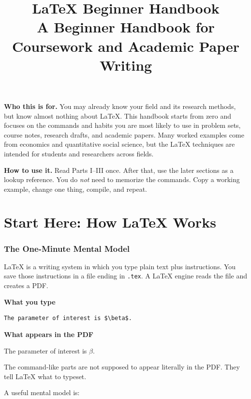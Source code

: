 \documentclass[11pt]{article}
\title{\textbf{LaTeX Beginner Handbook}\\[0.35em]
\large A Beginner Handbook for Coursework and Academic Paper Writing}
\author{}
\date{}
\newcommand{\code}[1]{\texttt{#1}}
\theoremstyle{definition}
\newcommand{\sourcehead}{\par\smallskip\textbf{What you type}\par}
\newcommand{\resulthead}{\par\smallskip\textbf{What appears in the PDF}\par\smallskip}
\begin{document}
\maketitle

\begin{center}
\begin{minipage}{0.91\textwidth}
\small
\textbf{Who this is for.} You may already know your field and its research methods, but know almost nothing about LaTeX. This handbook starts from zero and focuses on the commands and habits you are most likely to use in problem sets, course notes, research drafts, and academic papers. Many worked examples come from economics and quantitative social science, but the LaTeX techniques are intended for students and researchers across fields.

\textbf{How to use it.} Read Parts I--III once. After that, use the later sections as a lookup reference. You do \emph{not} need to memorize the commands. Copy a working example, change one thing, compile, and repeat.
\end{minipage}
\end{center}

\tableofcontents
\clearpage

\part{Start Here: How LaTeX Works}

\section{The One-Minute Mental Model}

LaTeX is a writing system in which you type plain text plus instructions. You save those instructions in a file ending in \code{.tex}. A LaTeX engine reads the file and creates a PDF.

\sourcehead
\begin{lstlisting}
The parameter of interest is $\beta$.
\end{lstlisting}

\resulthead
The parameter of interest is $\beta$.

The command-like parts are not supposed to appear literally in the PDF. They tell LaTeX what to typeset.

A useful mental model is:
\end{document}
